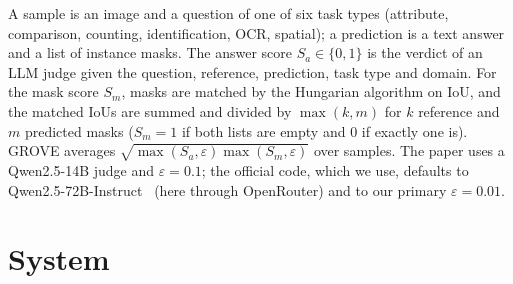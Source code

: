 \documentclass{article}
\begin{document}
A sample is an image and a question of one of six task types
(attribute, comparison, counting, identification, OCR, spatial); a prediction is a text answer and a list of instance masks.
The answer score $S_a\in\{0,1\}$ is the verdict of an LLM judge given the question, reference, prediction, task type and domain.
For the mask score $S_m$, masks are matched by the Hungarian algorithm on IoU,
and the matched IoUs are summed and divided by $\max(k,m)$ for $k$ reference and $m$ predicted masks
($S_m=1$ if both lists are empty and 0 if exactly one is).
GROVE averages $\sqrt{\max(S_a,\varepsilon)\max(S_m,\varepsilon)}$ over samples.
The paper uses a Qwen2.5-14B judge and $\varepsilon=0.1$; the official code, which we use,
defaults to Qwen2.5-72B-Instruct~\citep{qwen25} (here through OpenRouter) and to our primary $\varepsilon=0.01$.

\section{System}
\label{sec:system}
\end{document}
